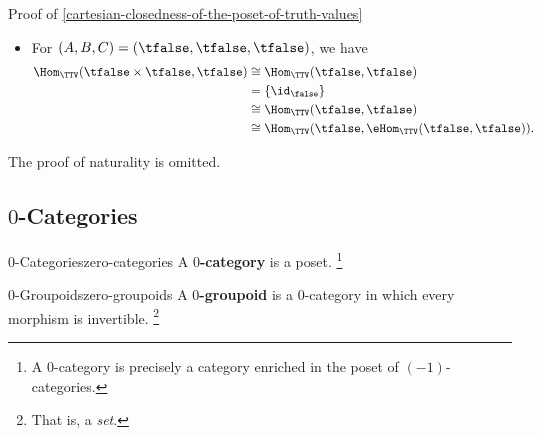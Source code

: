 \begin{Proof}{Proof of \cref{cartesian-closedness-of-the-poset-of-truth-values}}
\begin{itemize}
\begin{align*}
                                                          &\cong \Hom_{\TTV}(\tfalse,\eHom_{\TTV}(\tfalse,\ttrue)).
            \end{align*}
        \item For $(A,B,C)=(\tfalse,\tfalse,\tfalse)$, we have
            \begin{align*}
                \Hom_{\TTV}(\tfalse\times\tfalse,\tfalse) &\cong \Hom_{\TTV}(\tfalse,\tfalse)\\
                                                          &=     \{\id_{\false}\}\\
                                                          &\cong \Hom_{\TTV}(\tfalse,\tfalse)\\
                                                          &\cong \Hom_{\TTV}(\tfalse,\eHom_{\TTV}(\tfalse,\tfalse)).
            \end{align*}
    \end{itemize}
    The proof of naturality is omitted.
\end{Proof}
\subsection{$0$-Categories}\label{subsection-zero-categories}
\begin{definition}{$0$-Categories}{zero-categories}%
    A \textbf{$0$-category} is a poset.%
    \footnote{%
        A $0$-category is precisely a category enriched in the poset of $(-1)$-categories.
        \par\vspace*{\TCBBoxCorrection}
    }%
\end{definition}
\begin{definition}{$0$-Groupoids}{zero-groupoids}%
    A \textbf{$0$-groupoid} is a $0$-category in which every morphism is invertible.%
    \footnote{%
        That is, a \emph{set}.
        \par\vspace*{\TCBBoxCorrection}
    }%
\end{definition}
